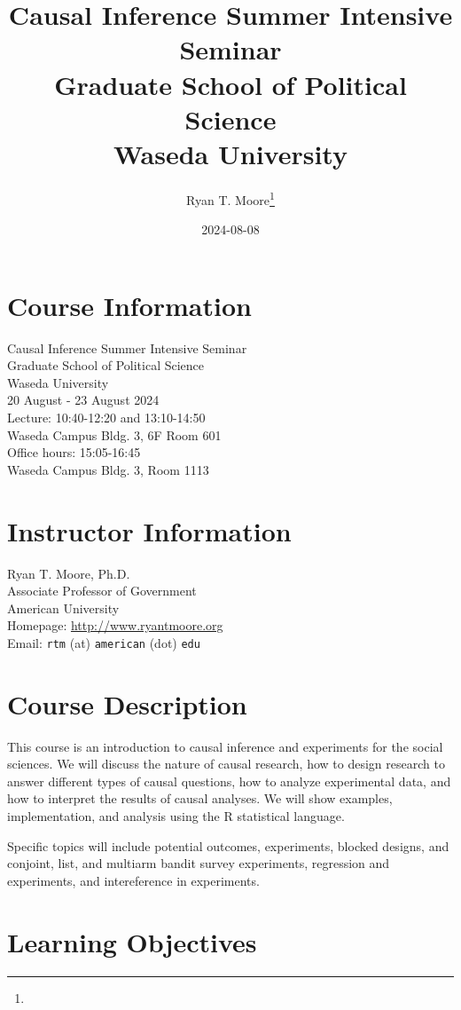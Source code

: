 \documentclass[11pt]{article}
\title{Causal Inference Summer Intensive Seminar \\ Graduate School of Political Science \\ Waseda University }
\author{Ryan T. Moore\footnote{\rtmaddr}}
\date{2024-08-08}
\newcommand{\firstdate}{20 }
\newcommand{\thisyear}{2024}
\begin{document}
\maketitle

\section*{Course Information}
Causal Inference Summer Intensive Seminar \\ Graduate School of Political Science \\ Waseda University \\
\firstdate August - 23 August \thisyear\\
Lecture: 10:40-12:20 and 13:10-14:50 \\
Waseda Campus Bldg. 3, 6F Room 601 \\
Office hours: 15:05-16:45  \\
Waseda Campus Bldg. 3, Room 1113

\section*{Instructor Information}
Ryan T. Moore, Ph.D. \\
Associate Professor of Government\\
American University\\
Homepage: \url{http://www.ryantmoore.org} \\
Email: {\tt rtm} (at) {\tt american} (dot) {\tt edu} 

\vspace{.1in}

\section*{Course Description}

This course is an introduction to causal inference and experiments for the social sciences. We will discuss the nature of causal research, how to design research to answer different types of causal questions, how to analyze experimental data, and how to interpret the results of causal analyses. We will show examples, implementation, and analysis using the R statistical language.

Specific topics will include potential outcomes, experiments, blocked designs, and conjoint, list, and multiarm bandit survey experiments, regression and experiments, and intereference in experiments.

\section*{Learning Objectives}
\end{document}
